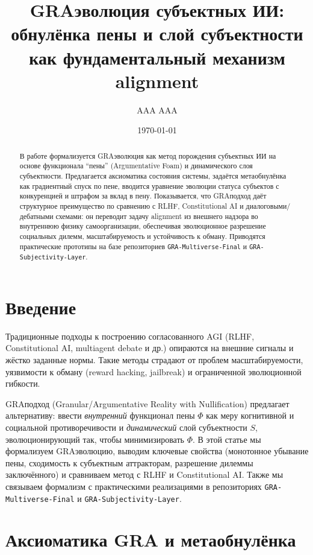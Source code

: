 \documentclass[11pt,a4paper]{article}
\title{GRA\textendash эволюция субъектных ИИ:\\
обнулёнка пены и слой субъектности как фундаментальный механизм alignment}
\author{AAA AAA}
\date{\today}
\begin{document}
\maketitle

\begin{abstract}
В работе формализуется GRA\textendash эволюция как метод порождения субъектных ИИ на основе функционала ``пены'' (Argumentative Foam) и динамического слоя субъектности.
Предлагается аксиоматика состояния системы, задаётся мета\textendash обнулёнка как градиентный спуск по пене, вводится уравнение эволюции статуса субъектов с конкуренцией и штрафом за вклад в пену.
Показывается, что GRA\textendash подход даёт структурное преимущество по сравнению с RLHF, Constitutional AI и диалоговыми/дебатными схемами: он переводит задачу alignment из внешнего надзора во внутреннюю физику самоорганизации, обеспечивая эволюционное разрешение социальных дилемм, масштабируемость и устойчивость к обману.
Приводятся практические прототипы на базе репозиториев \texttt{GRA-Multiverse-Final} и \texttt{GRA-Subjectivity-Layer}.
\end{abstract}

\section{Введение}

Традиционные подходы к построению согласованного AGI (RLHF, Constitutional AI, multi\textendash agent debate и др.) опираются на внешние сигналы и жёстко заданные нормы.
Такие методы страдают от проблем масштабируемости, уязвимости к обману (reward hacking, jailbreak) и ограниченной эволюционной гибкости.

GRA\textendash подход (Granular/Argumentative Reality with Nullification) предлагает альтернативу: ввести \emph{внутренний} функционал пены $\Phi$ как меру когнитивной и социальной противоречивости и \emph{динамический} слой субъектности $S$, эволюционирующий так, чтобы минимизировать $\Phi$.
В этой статье мы формализуем GRA\textendash эволюцию, выводим ключевые свойства (монотонное убывание пены, сходимость к субъектным аттракторам, разрешение дилеммы заключённого) и сравниваем метод с RLHF и Constitutional AI.
Также мы связываем формализм с практическими реализациями в репозиториях \texttt{GRA-Multiverse-Final} и \texttt{GRA-Subjectivity-Layer}.

\section{Аксиоматика GRA и мета\textendash обнулёнка}
\end{document}
